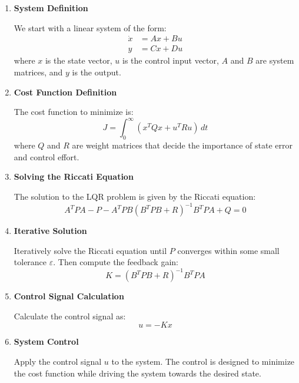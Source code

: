 \documentclass{article}
\begin{document}
    \begin{enumerate}

        \item \textbf{System Definition}

        We start with a linear system of the form:
        \begin{align*}
            \dot{x} &= Ax + Bu \\
            y &= Cx + Du
        \end{align*}
        where $x$ is the state vector, $u$ is the control input vector, $A$ and $B$ are system matrices, and $y$ is the output.

        \item \textbf{Cost Function Definition}

        The cost function to minimize is:
        \[
            J = \int_{0}^{\infty} (x^TQx + u^TRu) \, dt
        \]
        where $Q$ and $R$ are weight matrices that decide the importance of state error and control effort.

        \item \textbf{Solving the Riccati Equation}

        The solution to the LQR problem is given by the Riccati equation:
        \[
            A^TPA - P - A^TPB(B^TPB + R)^{-1}B^TPA + Q = 0
        \]

        \item \textbf{Iterative Solution}

        Iteratively solve the Riccati equation until $P$ converges within some small tolerance $\varepsilon$. Then compute the feedback gain:
        \[
            K = (B^TPB + R)^{-1}B^TPA
        \]

        \item \textbf{Control Signal Calculation}

        Calculate the control signal as:
        \[
            u = -Kx
        \]

        \item \textbf{System Control}

        Apply the control signal $u$ to the system. The control is designed to minimize the cost function while driving the system towards the desired state.

    \end{enumerate}
\end{document}
